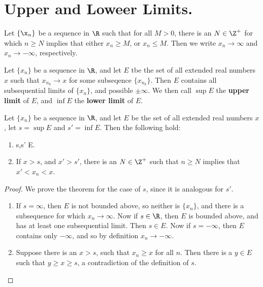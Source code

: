
\section{Upper and Loweer Limits.}

Let $\{\x_n\}$ be a sequence in  $\R$ such that for all  $M>0$, there is an  $N \in \Z^+$ 
for which  $n \geq N$ implies that either  $x_n \geq M$, or  $x_n \leq M$. Then we write 
 $x_n \rightarrow \infty$ and  $x_n \rightarrow -\infty$, respectively.

 \begin{definition}
     Let $\{x_n\}$ be a sequence in $\R$, and let $E$ tbe the set of all extended real 
     numbers $x$  such that $x_{n_k} \rightarrow x$ for some subseqence  $\{x_{n_k}\}$. Then 
     $E$ contains all subsequential limits of  $\{x_n\}$, and possible  $\pm\infty$. We then 
     call  $\sup{E}$ the  \textbf{upper limit} of $E$, and  $\inf{E}$ the \textbf{lower limit} of 
     $E$.
 \end{definition}

 \begin{theorem}\label{4.1.1}
     Let $\{x_n\}$ be a sequence in  $\R$, and let  $E$ be the set of all extended real 
     numbers  $x$, let  $s=\sup{E}$ and  $s'=\inf{E}$. Then the following hold:
         \begin{enumerate}[label=(\arabic*)]
             \item s,s' \in E.

             \item If $x>s$, and $x'>s'$, there is an $N \in \Z^+$ such that $n \geq N$ 
                 implies that $x'<x_n<x$.
        \end{enumerate}
 \end{theorem}
 \begin{proof}
     We prove the theorem for the case of $s$, since it is analogous for  $s'$.
        \begin{enumerate}[label=(\arabic*)]
            \item If $s=\infty$, then $E$ is not bounded above, so neither is  $\{x_n\}$, and 
                there is a subsequence for which $x_n \rightarrow \infty$. Now if $s \in \R$, then 
                 $E$ is bounded above, and has at least one subsequential limit. Then  $s \in E$. 
                 Now if  $s=-\infty$, then  $E$ contains only $-\infty$, and so by definition  
                 $x_n \rightarrow -\infty$.

             \item Suppose there is an $x>s$, such that  $x_n \geq x$ for all  $n$. Then there 
                 is a  $y \in E$ such that  $y \geq x \geq s$, a contradiction of the definition of  $s$.
        \end{enumerate}
 \end{proof}

